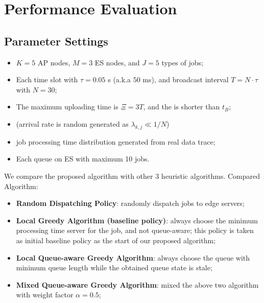 \section{Performance Evaluation}

\subsection{Parameter Settings}
\begin{itemize}
    \item $K=5$ AP nodes, $M=3$ ES nodes, and $J=5$ types of jobs;
    \item Each time slot with $\tau=0.05$ s (a.k.a $50$ ms), and broadcast interval $T=N \cdot \tau$ with $N=30$;
    \item The maximum uploading time is $\Xi = 3 T$, and the \brdelay is shorter than $t_B$;
    \item (arrival rate is random generated as $\lambda_{k,j} \ll 1/N$)
    \item job processing time distribution generated from real data trace;
    \item Each queue on ES with maximum 10 jobs.
\end{itemize}

We compare the proposed algorithm with other 3 heuristic algorithms.
Compared Algorithm:
\begin{itemize}
    \item \textbf{Random Dispatching Policy}:
            randomly dispatch jobs to edge servers;
    \item \textbf{Local Greedy Algorithm (baseline policy)}:
            always choose the minimum processing time server for the job, and not queue-aware; this policy is taken as initial baseline policy as the start of our proposed algorithm;
    \item \textbf{Local Queue-aware Greedy Algorithm}:
            always choose the queue with minimum queue length while the obtained queue state is stale;
    \item \textbf{Mixed Queue-aware Greedy Algorithm}:
            mixed the above two algorithm with weight factor $\alpha = 0.5$;
\end{itemize}


